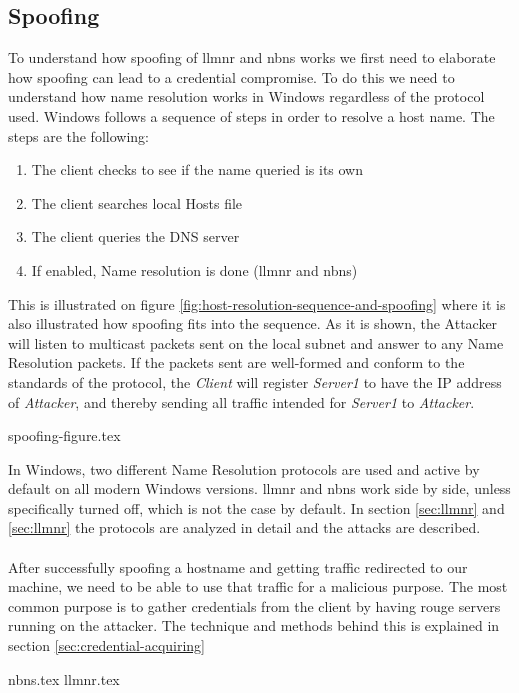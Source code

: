 \documentclass{article}
\begin{document}
\subsection{Spoofing}
\label{sec:spoofing}
To understand how spoofing of \gls{llmnr} and \gls{nbns} works we first need to elaborate how spoofing can lead to a credential compromise. To do this we need to understand how name resolution works in Windows regardless of the protocol used. Windows follows a sequence of steps in order to resolve a host name.\cite{url:microsoft:name-resolution-order} The steps are the following:
\begin{enumerate}
	\item The client checks to see if the name queried is its own
	\item The client searches local Hosts file
	\item The client queries the DNS server
	\item If enabled, Name resolution is done (\gls{llmnr} and \gls{nbns})
\end{enumerate}

This is illustrated on figure \ref{fig:host-resolution-sequence-and-spoofing} where it is also illustrated how spoofing fits into the sequence. As it is shown, the Attacker will listen to multicast packets sent on the local subnet and answer to any Name Resolution packets. If the packets sent are well-formed and conform to the standards of the protocol, the \emph{Client} will register \emph{Server1} to have the IP address of \emph{Attacker}, and thereby sending all traffic intended for \emph{Server1} to \emph{Attacker}.

{spoofing-figure.tex}

In Windows, two different Name Resolution protocols are used and active by default on all modern Windows versions. \gls{llmnr} and \gls{nbns} work side by side, unless specifically turned off, which is not the case by default. In section \ref{sec:llmnr} and \ref{sec:llmnr} the protocols are analyzed in detail and the attacks are described.
\\\\
After successfully spoofing a hostname and getting traffic redirected to our machine, we need to be able to use that traffic for a malicious purpose. The most common purpose is to gather credentials from the client by having rouge servers running on the attacker. The technique and methods behind this is explained in section \ref{sec:credential-acquiring}

{nbns.tex}
{llmnr.tex}
\end{document}
